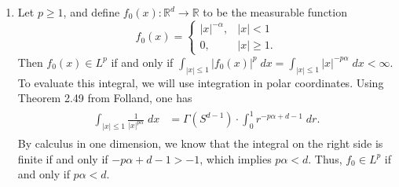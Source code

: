 \documentclass{article}
\begin{document}
\begin{enumerate}[itemsep =-2pt,label = (\alph{*})]
	\item Let $p \geq 1$, and define $f_{0}(x):\mathbb{R}^{d} \to \mathbb{R}$ to be the measurable function 
	\begin{equation*}
		f_{0}(x) = 
		\begin{cases}
			|x|^{-\alpha}, & |x| < 1 \\
			0, & |x| \geq 1.
		\end{cases}
	\end{equation*}
	Then $f_{0}(x) \in L^{p}$ if and only if $\int_{|x|\leq 1}|f_{0}(x)|^{p}\;dx = \int_{|x|\leq 1}|x|^{-p\alpha}\;dx < \infty$. To evaluate this integral, we will use integration in polar coordinates. Using Theorem 2.49 from Folland, one has 
	\begin{align*}
		\begin{split}
			\int_{|x|\leq 1}\frac{1}{|x|^{p\alpha}}\;dx &= \Gamma(S^{d-1})\cdot \int_{0}^{1}r^{-p\alpha + d - 1}\;dr. 
		\end{split}
	\end{align*}
	By calculus in one dimension, we know that the integral on the right side is finite if and only if $-p\alpha + d - 1 > -1$, which implies $p\alpha < d$. Thus, $f_{0} \in L^{p}$ if and only if $p\alpha < d$. 
	

\end{enumerate}
\end{document}
